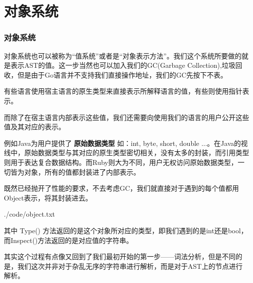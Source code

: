 \documentclass{beamer}
\begin{document}
	\section{对象系统}
	\begin{frame}
		\frametitle{对象系统}
		对象系统也可以被称为“值系统”或者是“对象表示方法”。我们这个系统所要做的就是表示AST的值。这一步当然也可以加入我们的GC(Garbage Collection),垃圾回收，但是由于Go语言并不支持我们直接操作地址，我们的GC先按下不表。
		
		有些语言使用宿主语言的原生类型来直接表示所解释语言的值，有些则使用指针表示。
		
		而除了在宿主语言内部表示这些值，我们还需要向使用我们的语言的用户公开这些值及其对应的表示。
		
		例如Java为用户提供了 \textbf{原始数据类型} 如：int, byte, short, double ...。在Java的视线中，原始数据类型与其对应的原生类型密切相关，没有太多的封装，而引用类型则用于表达复合数据结构。而Ruby则大为不同，用户无权访问原始数据类型，一切皆为对象，所有的值都封装进了内部表示。
	\end{frame}

	\begin{frame}
		既然已经抛开了性能的要求，不去考虑GC，我们就直接对于遇到的每个值都用Object表示，将其封装进去。
		
		
		{./code/object.txt}
		
		其中 Type() 方法返回的是这个对象所对应的类型，即我们遇到的是int还是bool，而Inspect()方法返回的是对应值的字符串。
		
		其实这个过程有点像又回到了我们最初开始的第一步——词法分析，但是不同的是，我们这次并非对于杂乱无序的字符串进行解析，而是对于AST上的节点进行解析。
	\end{frame}
\end{document}
